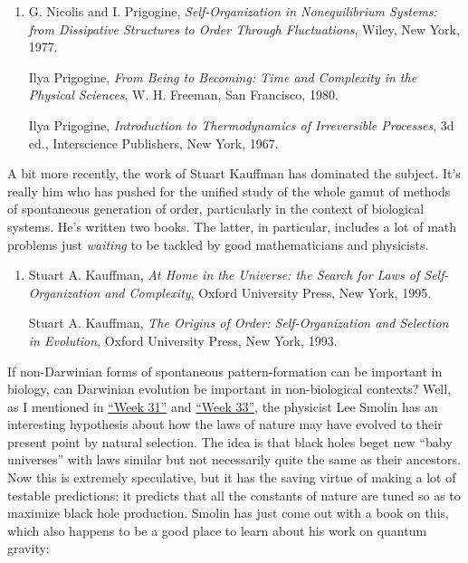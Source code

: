 \documentclass{article}
\begin{document}
\begin{enumerate}
\def\labelenumi{\arabic{enumi})}
\setcounter{enumi}{1}
\item
  G. Nicolis and I. Prigogine, \emph{Self-Organization in Nonequilibrium
  Systems: from Dissipative Structures to Order Through Fluctuations},
  Wiley, New York, 1977.

  Ilya Prigogine, \emph{From Being to Becoming: Time and Complexity in
  the Physical Sciences}, W. H. Freeman, San Francisco, 1980.

  Ilya Prigogine, \emph{Introduction to Thermodynamics of Irreversible
  Processes}, 3d ed., Interscience Publishers, New York, 1967.
\end{enumerate}

A bit more recently, the work of Stuart Kauffman has dominated the
subject. It's really him who has pushed for the unified study of the
whole gamut of methods of spontaneous generation of order, particularly
in the context of biological systems. He's written two books. The
latter, in particular, includes a lot of math problems just
\emph{waiting} to be tackled by good mathematicians and physicists.

\begin{enumerate}
\def\labelenumi{\arabic{enumi})}
\setcounter{enumi}{2}
\item
  Stuart A. Kauffman, \emph{At Home in the Universe: the Search for Laws
  of Self-Organization and Complexity}, Oxford University Press, New
  York, 1995.

  Stuart A. Kauffman, \emph{The Origins of Order: Self-Organization and
  Selection in Evolution}, Oxford University Press, New York, 1993.
\end{enumerate}

If non-Darwinian forms of spontaneous pattern-formation can be important
in biology, can Darwinian evolution be important in non-biological
contexts? Well, as I mentioned in \protect\hyperlink{week31}{``Week
31''} and \protect\hyperlink{week33}{``Week 33''}, the physicist Lee
Smolin has an interesting hypothesis about how the laws of nature may
have evolved to their present point by natural selection. The idea is
that black holes beget new ``baby universes'' with laws similar but not
necessarily quite the same as their ancestors. Now this is extremely
speculative, but it has the saving virtue of making a lot of testable
predictions: it predicts that all the constants of nature are tuned so
as to maximize black hole production. Smolin has just come out with a
book on this, which also happens to be a good place to learn about his
work on quantum gravity:
\end{document}
